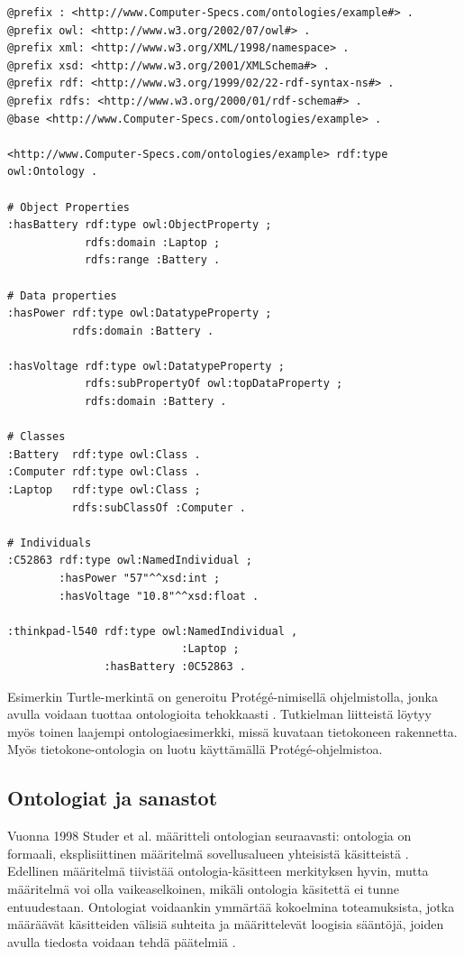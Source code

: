 \documentclass[finnish, 12pt, a4paper, elec, utf8, pdfa, online]{aaltothesis}
\begin{document}
{%
\begin{lstlisting}[style=codeblock,caption={OWL esimerkki.},captionpos=b,label={owl_esim}]
@prefix : <http://www.Computer-Specs.com/ontologies/example#> .
@prefix owl: <http://www.w3.org/2002/07/owl#> .
@prefix xml: <http://www.w3.org/XML/1998/namespace> .
@prefix xsd: <http://www.w3.org/2001/XMLSchema#> .
@prefix rdf: <http://www.w3.org/1999/02/22-rdf-syntax-ns#> .
@prefix rdfs: <http://www.w3.org/2000/01/rdf-schema#> .
@base <http://www.Computer-Specs.com/ontologies/example> .

<http://www.Computer-Specs.com/ontologies/example> rdf:type owl:Ontology .

# Object Properties
:hasBattery rdf:type owl:ObjectProperty ;
            rdfs:domain :Laptop ;
            rdfs:range :Battery .

# Data properties
:hasPower rdf:type owl:DatatypeProperty ;
          rdfs:domain :Battery .

:hasVoltage rdf:type owl:DatatypeProperty ;
            rdfs:subPropertyOf owl:topDataProperty ;
            rdfs:domain :Battery .

# Classes
:Battery  rdf:type owl:Class .
:Computer rdf:type owl:Class .
:Laptop   rdf:type owl:Class ;
          rdfs:subClassOf :Computer .

# Individuals
:C52863 rdf:type owl:NamedIndividual ;
        :hasPower "57"^^xsd:int ;
        :hasVoltage "10.8"^^xsd:float .

:thinkpad-l540 rdf:type owl:NamedIndividual ,
                           :Laptop ;
               :hasBattery :0C52863 .

\end{lstlisting}
\vskip 0.75cm
Esimerkin Turtle-merkintä on generoitu Protégé-nimisellä ohjelmistolla, jonka avulla voidaan tuottaa ontologioita tehokkaasti \cite{Protege}. Tutkielman liitteistä löytyy myös toinen laajempi ontologiaesimerkki, missä kuvataan tietokoneen rakennetta. Myös tietokone-ontologia on luotu käyttämällä Protégé-ohjelmistoa.

\subsection{Ontologiat ja sanastot}

Vuonna 1998 Studer et al. määritteli ontologian seuraavasti: ontologia on formaali, eksplisiittinen määritelmä sovellusalueen yhteisistä käsitteistä \cite{ontology_def}.  Edellinen määritelmä tiivistää ontologia-käsitteen merkityksen hyvin, mutta määritelmä voi olla vaikeaselkoinen, mikäli ontologia käsitettä ei tunne entuudestaan. Ontologiat voidaankin ymmärtää kokoelmina toteamuksista, jotka määräävät käsitteiden välisiä suhteita ja määrittelevät loogisia sääntöjä, joiden avulla tiedosta voidaan tehdä päätelmiä \cite{Berners_visio}.

}
\end{document}
